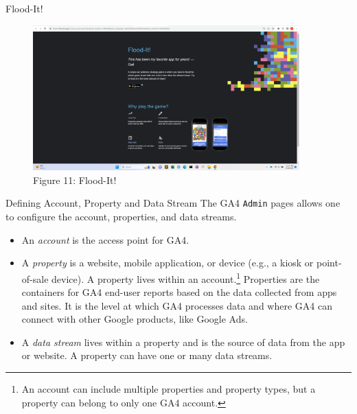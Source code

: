 \documentclass[pdf]{beamer}
\theoremstyle{remark}
\theoremstyle{definition}
\begin{document}
\begin{frame}[t]{Flood-It!}
\begin{figure}[htbp]
  \captionsetup{justification=centering}
  \includegraphics[height=5.6cm, trim=1.5cm 0.0cm 2.0cm 0.0cm width=5.6cm]{Images/GA4_2_091923.png}
  \caption{Figure {\color{franklinblue} 11}: Flood-It!}
\end{figure}
\end{frame}

\begin{frame}[t]{Defining Account, Property and Data Stream}
The GA4 \texttt{Admin} pages allows one to configure the account, properties, and data streams.\\
\vspace{1.5ex}
\begin{itemize}
\item An \textit{account} is the access point for GA4. 
\item A \textit{property} is a website, mobile application, or device (e.g., a kiosk or point-of-sale device).  A property lives within an account.\footnote{An account can include multiple properties and property types, but a property can belong to only one GA4 account.} Properties are the containers for GA4 end-user reports based on the data collected from apps and sites. It is the level at which GA4 processes data and where GA4 can connect with other Google products, like Google Ads.
\item A \textit{data stream} lives within a property and is the source of data from the app or website. A property can have one or many data streams.
\end{itemize}
\end{frame}
\end{document}

